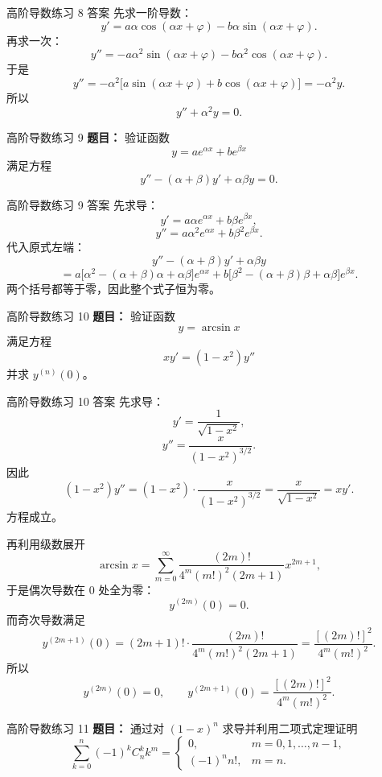 ﻿\documentclass[aspectratio=169,11pt]{ctexbeamer}
\begin{document}
\begin{frame}{高阶导数练习 8 答案}
\small
先求一阶导数：
\[
y'=a\alpha\cos(\alpha x+\varphi)-b\alpha\sin(\alpha x+\varphi).
\]
再求一次：
\[
y''=-a\alpha^2\sin(\alpha x+\varphi)-b\alpha^2\cos(\alpha x+\varphi).
\]
于是
\[
y''=-\alpha^2\bigl[a\sin(\alpha x+\varphi)+b\cos(\alpha x+\varphi)\bigr]
=-\alpha^2y.
\]
所以
\[
y''+\alpha^2y=0.
\]
\end{frame}

\begin{frame}{高阶导数练习 9}
\small
\textbf{题目：} 验证函数
\[
y=ae^{\alpha x}+be^{\beta x}
\]
满足方程
\[
y''-(\alpha+\beta)y'+\alpha\beta y=0.
\]
\end{frame}

\begin{frame}{高阶导数练习 9 答案}
\small
先求导：
\[
y'=a\alpha e^{\alpha x}+b\beta e^{\beta x},
\]
\[
y''=a\alpha^2 e^{\alpha x}+b\beta^2 e^{\beta x}.
\]
代入原式左端：
\[
y''-(\alpha+\beta)y'+\alpha\beta y
\]
\[
=a\bigl[\alpha^2-(\alpha+\beta)\alpha+\alpha\beta\bigr]e^{\alpha x}
+b\bigl[\beta^2-(\alpha+\beta)\beta+\alpha\beta\bigr]e^{\beta x}.
\]
两个括号都等于零，因此整个式子恒为零。
\end{frame}

\begin{frame}{高阶导数练习 10}
\small
\textbf{题目：} 验证函数
\[
y=\arcsin x
\]
满足方程
\[
xy'=(1-x^2)y''
\]
并求 $y^{(n)}(0)$。
\end{frame}

\begin{frame}[allowframebreaks]{高阶导数练习 10 答案}
\small
先求导：
\[
y'=\frac1{\sqrt{1-x^2}},
\]
\[
y''=\frac{x}{(1-x^2)^{3/2}}.
\]
因此
\[
(1-x^2)y''=(1-x^2)\cdot\frac{x}{(1-x^2)^{3/2}}
=\frac{x}{\sqrt{1-x^2}}=xy'.
\]
方程成立。

再利用级数展开
\[
\arcsin x=\sum_{m=0}^{\infty}\frac{(2m)!}{4^m(m!)^2(2m+1)}x^{2m+1},
\]
于是偶次导数在 $0$ 处全为零：
\[
y^{(2m)}(0)=0.
\]
而奇次导数满足
\[
y^{(2m+1)}(0)=(2m+1)!\cdot \frac{(2m)!}{4^m(m!)^2(2m+1)}
=\frac{[(2m)!]^2}{4^m(m!)^2}.
\]
所以
\[
y^{(2m)}(0)=0,\qquad
y^{(2m+1)}(0)=\frac{[(2m)!]^2}{4^m(m!)^2}.
\]
\end{frame}

\begin{frame}{高阶导数练习 11}
\small
\textbf{题目：} 通过对 $(1-x)^n$ 求导并利用二项式定理证明
\[
\sum_{k=0}^n(-1)^kC_n^kk^m=
\begin{cases}
0,&m=0,1,\dots,n-1,\\
(-1)^nn!,&m=n.
\end{cases}
\]
\end{frame}
\end{document}
